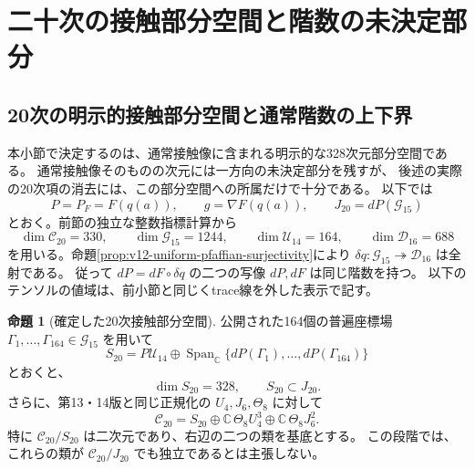\documentclass[a4paper,11pt]{ltjsarticle}
\theoremstyle{definition}
\newtheorem{proposition}[theorem]{命題}
\newcommand{\CC}{\mathbb C}
\begin{document}


\section{二十次の接触部分空間と階数の未決定部分}
\label{sec:v15-contact-subspace}

\subsection{20次の明示的接触部分空間と通常階数の上下界}
\label{subsec:v15-twentieth-contact-subspace}

本小節で決定するのは、通常接触像に含まれる明示的な328次元部分空間である。
通常接触像そのものの次元には一方向の未決定部分を残すが、
後述の実際の20次項の消去には、この部分空間への所属だけで十分である。
以下では
\[
 P=P_F=F(q(a)),\qquad g=\nabla F(q(a)),\qquad
 J_{20}=dP(\mathcal G_{15})
\]
とおく。前節の独立な整数指標計算から
\[
 \dim\mathcal C_{20}=330,\qquad
 \dim\mathcal G_{15}=1244,\qquad
 \dim\mathcal U_{14}=164,\qquad
 \dim\mathcal D_{16}=688
\]
を用いる。命題\ref{prop:v12-uniform-pfaffian-surjectivity}により
$\delta q:\mathcal G_{15}\twoheadrightarrow\mathcal D_{16}$ は全射である。
従って $dP=dF\circ\delta q$ の二つの写像 $dP,dF$ は同じ階数を持つ。
以下のテンソルの値域は、前小節と同じくtrace線を外した表示で記す。

\begin{proposition}[確定した20次接触部分空間]
\label{prop:v15-twentieth-contact-subspace}
公開された164個の普遍座標場
$\Gamma_1,\ldots,\Gamma_{164}\in\mathcal G_{15}$ を用いて
\[
 S_{20}=P\mathcal U_{14}\oplus
     \operatorname{Span}_{\CC}\{dP(\Gamma_1),\ldots,dP(\Gamma_{164})\}
\]
とおくと、
\[
 \dim S_{20}=328,\qquad S_{20}\subset J_{20}.
\]
さらに、第13・14版と同じ正規化の $U_4,J_6,\Theta_8$ に対して
\[
 \mathcal C_{20}
   =S_{20}\oplus
       \CC\,\Theta_8U_4^3\oplus\CC\,\Theta_8J_6^2.
 \tag{20S}\label{eq:v15-twentieth-certified-splitting}
\]
特に $\mathcal C_{20}/S_{20}$ は二次元であり、右辺の二つの類を基底とする。
この段階では、これらの類が $\mathcal C_{20}/J_{20}$ でも独立であるとは主張しない。
\end{proposition}
\end{document}
